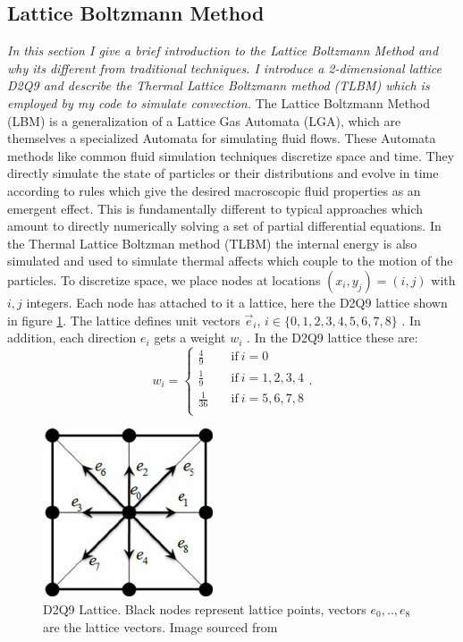 \documentclass{article}
\begin{document}
\subsection*{Lattice Boltzmann Method}
{\it{In this section I give a brief introduction to the Lattice Boltzmann Method and why its different from traditional techniques. I introduce a 2-dimensional lattice D2Q9 and describe the Thermal Lattice Boltzmann method (TLBM) which is employed by my code to simulate convection.}}
\vspace{0.3cm}
\newline
\noindent The Lattice Boltzmann Method (LBM) is a generalization of a Lattice Gas Automata (LGA), which are themselves a 
specialized Automata for simulating fluid flows. These Automata methods like common fluid simulation techniques 
discretize space and time. They directly simulate the state of particles or their distributions and evolve in time 
according to rules which give the desired macroscopic fluid properties as an emergent effect. This is fundamentally 
different to typical approaches which amount to directly numerically solving a set of partial differential equations. In the Thermal Lattice Boltzman method (TLBM) the internal energy is also simulated and used to simulate thermal affects which couple to the motion of the particles.
\newline
\noindent To discretize space, we place nodes at locations $(x_i,y_j)=(i,j)$ with $i,j$ integers. Each node has attached to it a lattice, here the D2Q9 lattice shown in figure \ref{D2Q9}. The lattice defines unit vectors $\vec{e}_i$, $i \in \{ 0,1,2,3,4,5,6,7,8 \}$ \cite{mora2017simulation}. In addition, each direction $e_i$ gets a weight $w_i$ \cite{mora2017simulation}. In the D2Q9 lattice these are:
\begin{equation*}
w_i = \begin{cases}
          \frac{4}{9} \quad &\text{if}  \ i=0 \\
          \frac{1}{9} \quad &\text{if} \ i=1,2,3,4 \\
          \frac{1}{36} \quad &\text{if} \ i=5,6,7,8 \\
     \end{cases}.
\end{equation*}
\begin{figure}[h!]
	\centering
	\includegraphics{D2Q9Lattice.jpg}
	\caption{D2Q9 Lattice. Black nodes represent lattice points, vectors $e_0,..,e_8$ are the lattice vectors. Image sourced from \cite{khazaeli2015ghost}}
	\label{D2Q9}
\end{figure}
\end{document}
